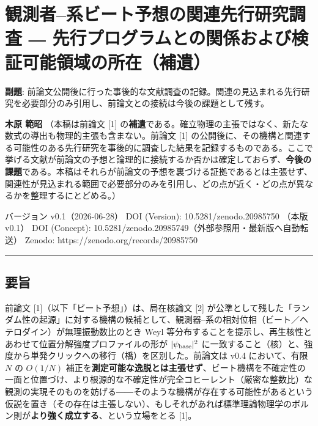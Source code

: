 \documentclass[
]{ltjsarticle}
\author{}
\date{}
\begin{document}
\section{観測者--系ビート予想の関連先行研究調査 ―
先行プログラムとの関係および検証可能領域の所在（補遺）}\label{ux89b3ux6e2cux8005ux7cfbux30d3ux30fcux30c8ux4e88ux60f3ux306eux95a2ux9023ux5148ux884cux7814ux7a76ux8abfux67fb-ux5148ux884cux30d7ux30edux30b0ux30e9ux30e0ux3068ux306eux95a2ux4fc2ux304aux3088ux3073ux691cux8a3cux53efux80fdux9818ux57dfux306eux6240ux5728ux88dcux907a}

\textbf{副題}:
前論文公開後に行った事後的な文献調査の記録。関連の見込まれる先行研究を必要部分のみ引用し、前論文との接続は今後の課題として残す。

\textbf{木原 範昭} （本稿は前論文 {[}1{]}
の\textbf{補遺}である。確立物理の主張ではなく、新たな数式の導出も物理的主張も含まない。前論文
{[}1{]}
の公開後に、その機構と関連する可能性のある先行研究を事後的に調査した結果を記録するものである。ここで挙げる文献が前論文の予想と論理的に接続するか否かは確定しておらず、\textbf{今後の課題}である。本稿はそれらが前論文の予想を裏づける証拠であるとは主張せず、関連性が見込まれる範囲で必要部分のみを引用し、どの点が近く・どの点が異なるかを整理するにとどめる。）

バージョン v0.1（2026-06-28） DOI (Version): 10.5281/zenodo.20985750
（本版 v0.1） DOI (Concept):
10.5281/zenodo.20985749（外部参照用・最新版へ自動転送） Zenodo:
https://zenodo.org/records/20985750

\begin{center}\rule{0.5\linewidth}{0.5pt}\end{center}

\subsection{要旨}\label{ux8981ux65e8}

前論文 {[}1{]}（以下「ビート予想」）は、局在核論文 {[}2{]}
が公準として残した「ランダム性の起源」に対する機構の候補として、観測器--系の相対位相（ビート／ヘテロダイン）が無理振動数比のとき
Weyl
等分布することを提示し、再生核性とあわせて位置分解強度プロファイルの形が
\(|\psi_{\rm base}|^2\)
に一致すること（核）と、強度から単発クリックへの移行（橋）を区別した。前論文は
v0.4 において、有限 \(N\) の \(O(1/N)\)
補正を\textbf{測定可能な逸脱とは主張せず}、ビート機構を不確定性の一面と位置づけ、より根源的な不確定性が完全コヒーレント（厳密な整数比）な観測の実現そのものを妨げる――そのような機構が存在する可能性があるという仮説を置き（その存在は主張しない）、もしそれがあれば標準理論物理学のボルン則が\textbf{より強く成立する}、という立場をとる
{[}1{]}。
\end{document}
